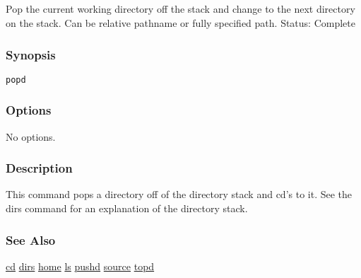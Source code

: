 \subsection{}
\label{popd}
Pop the current working directory off the stack and change to the next directory on the stack. Can be relative pathname or fully specified path. 
 Status: Complete
\subsubsection*{Synopsis}
\begin{verbatim}
popd
\end{verbatim}
\subsubsection*{Options}
 No options. 
\subsubsection*{Description}
 This command pops a directory off of the directory stack and cd's to it. See the dirs command for an explanation of the directory stack. 
\subsubsection*{See Also}
\hyperref[cd]{cd} \hyperref[dirs]{dirs} \hyperref[home]{home} \hyperref[ls]{ls} \hyperref[pushd]{pushd} \hyperref[source]{source} \hyperref[topd]{topd} 